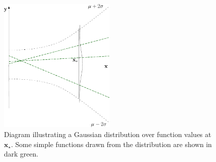 \documentclass{article}
\begin{document}
\begin{figure}
\centering
\includegraphics[width=0.5\textwidth]{function_distribution_cropped}
\caption{Diagram illustrating a Gaussian distribution over function values at $\mathbf{x}_{\star}$. Some simple functions drawn
from the distribution are shown in dark green.}
\label{fig:func_distribution}
\end{figure}
\end{document}
